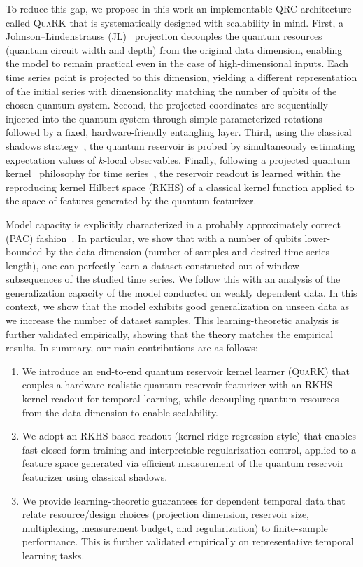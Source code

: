 To reduce this gap, we propose in this work an implementable QRC architecture called \textsc{QuaRK} that is systematically designed with scalability in mind. First, a Johnson--Lindenstrauss (JL)~\cite{mohri2018foundations} projection decouples the quantum resources (quantum circuit width and depth) from the original data dimension, enabling the model to remain practical even in the case of high-dimensional inputs. Each time series point is projected to this dimension, yielding a different representation of the initial series with dimensionality matching the number of qubits of the chosen quantum system. Second, the projected coordinates are sequentially injected into the quantum system through simple parameterized rotations followed by a fixed, hardware-friendly entangling layer. Third, using the classical shadows strategy~\cite{huang-classical-shadows-2020}, the quantum reservoir is probed by simultaneously estimating expectation values of $k$-local observables. Finally, following a projected quantum kernel~\cite{Huang_Broughton_Mohseni_Babbush_Boixo_Neven_McClean_2021} philosophy for time series~\cite{Aaraba_Cherkaoui_Ahmad_Laprade_Nahman-Lévesque_Vieloszynski_Wang_2024}, the reservoir readout is learned within the reproducing kernel Hilbert space (RKHS) of a classical kernel function applied to the space of features generated by the quantum featurizer. 

Model capacity is explicitly characterized in a probably approximately correct (PAC) fashion~\cite{ShalevShwartz2014,mohri2018foundations}. In particular, we show that with a number of qubits lower-bounded by the data dimension (number of samples and desired time series length), one can perfectly learn a dataset constructed out of window subsequences of the studied time series. We follow this with an analysis of the generalization capacity of the model conducted on weakly dependent data. In this context, we show that the model exhibits good generalization on unseen data as we increase the number of dataset samples. This learning-theoretic analysis is further validated empirically, showing that the theory matches the empirical results. In summary, our main contributions are as follows:
\begin{enumerate}
    \item We introduce an end-to-end quantum reservoir kernel learner (\textsc{QuaRK}) that couples a hardware-realistic quantum reservoir featurizer with an RKHS kernel readout for temporal learning, while decoupling quantum resources from the data dimension to enable scalability.
    \item We adopt an RKHS-based readout (kernel ridge regression-style) that enables fast closed-form training and interpretable regularization control, applied to a feature space generated via efficient measurement of the quantum reservoir featurizer using classical shadows.
    \item We provide learning-theoretic guarantees for dependent temporal data that relate resource/design choices (projection dimension, reservoir size, multiplexing, measurement budget, and regularization) to finite-sample performance. This is further validated empirically on representative temporal learning tasks.
\end{enumerate}


